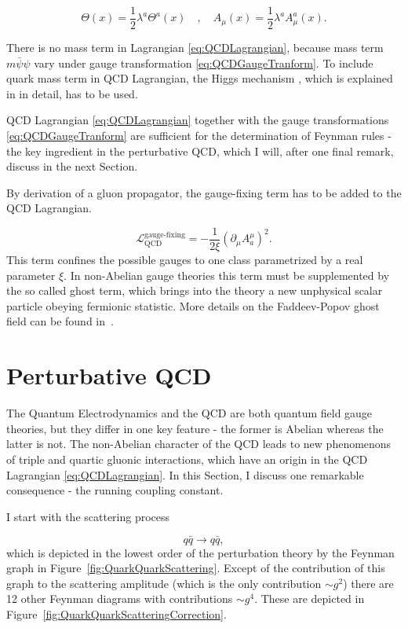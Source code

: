 \begin{equation}
  \Theta(x) = \frac{1}{2} \lambda^a \Theta^a(x) 
  \quad , \quad
  A_\mu(x) = \frac{1}{2} \lambda^a A_\mu^a(x).
  \label{eq:QCDAdditionalFunctions}
\end{equation}

There is no mass term in Lagrangian \eqref{eq:QCDLagrangian}, because mass term
$m\bar{\psi}\psi$ vary under gauge transformation
\eqref{eq:QCDGaugeTranform}. To include quark mass term in QCD Lagrangian, the
Higgs mechanism \cite{HiggsMechanism}, which is explained in
\cite{horejsi2002fundamentals} in detail, has to be used.

QCD Lagrangian \eqref{eq:QCDLagrangian} together with the gauge transformations
\eqref{eq:QCDGaugeTranform} are sufficient for the determination of Feynman rules -
the key ingredient in the perturbative QCD, which I will, after one final
remark, discuss in the next Section.

By derivation of a gluon propagator, the gauge-fixing term has to be added to
the QCD Lagrangian.

\begin{equation}
  \mathscr{L}_{\text{QCD}}^{\text{gauge-fixing}} = - \frac{1}{2\xi} \left( \partial_\mu A_a^\mu
  \right)^2.
  \label{eq:QCDGaugeFixingTerm}
\end{equation}
This term confines the possible gauges to one class parametrized by a real parameter
$\xi$. In non-Abelian gauge theories this term must be supplemented by the so
called ghost term, which brings into the theory a new unphysical scalar particle
obeying fermionic statistic. More details on the Faddeev-Popov ghost field
can be found in~\cite{FaddeevPopovGhosts}.


\section{Perturbative QCD}

The Quantum Electrodynamics and the QCD are both quantum field gauge theories, but
they differ in one key feature - the former is Abelian whereas the latter is
not. The non-Abelian character of the QCD leads to new phenomenons of triple and
quartic gluonic interactions, which have an origin in the QCD Lagrangian
\eqref{eq:QCDLagrangian}. 
In this Section, I discuss one remarkable consequence - the running coupling
constant.

I start with the scattering process

\begin{equation}
  q \bar{q} \rightarrow q \bar{q},
  \label{eq:QuarkScattering}
\end{equation}
which is depicted in the lowest order of the perturbation theory by the Feynman
graph in Figure~\ref{fig:QuarkQuarkScattering}. Except of the contribution of this
graph to the scattering amplitude (which is the only contribution $\sim g^2$)
there are 12 other Feynman diagrams with contributions $\sim g^4$. These are
depicted in Figure~\ref{fig:QuarkQuarkScatteringCorrection}. 

